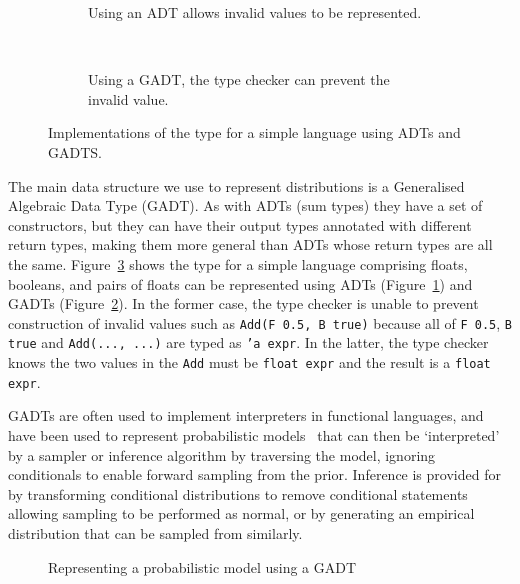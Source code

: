 \documentclass[sigconf]{acmart}
\begin{document}
\begin{figure}
  \centering
  \begin{subfigure}[t]{\columnwidth}
    \caption{\label{lst:adt}Using an ADT allows invalid values to be represented.}
  \end{subfigure}
  \quad\\
  \begin{subfigure}[t]{\columnwidth}
    \caption{\label{lst:gadteg}Using a GADT, the type checker can prevent the invalid value.}
  \end{subfigure}
  \caption{\label{lst:adtgadt}Implementations of the type for a simple language using ADTs and GADTS.}
\end{figure}

The main data structure we use to represent distributions is a Generalised Algebraic Data Type (GADT). As with ADTs (sum types) they have a set of constructors, but they can have their output types annotated with different return types, making them more general than ADTs whose return types are all the same. Figure~\ref{lst:adtgadt} shows the type for  a simple language comprising floats, booleans, and pairs of floats can be represented using ADTs (Figure~\ref{lst:adt}) and GADTs (Figure~\ref{lst:gadteg}). In the former case, the type checker is unable to prevent construction of invalid values such as \texttt{Add(F 0.5, B true)} because all of \texttt{F 0.5}, \texttt{B true} and \texttt{Add(..., ...)} are typed as \texttt{'a expr}. In the latter, the type checker knows the two values in the \texttt{Add} must be \texttt{float expr} and the result is a \texttt{float expr}.

GADTs are often used to implement interpreters in functional languages, and have been used to represent probabilistic models~\cite{scibior2015practical} that can then be `interpreted' by a sampler or inference algorithm by traversing the model, ignoring conditionals to enable forward sampling from the prior. Inference is provided for by transforming conditional distributions to remove conditional statements allowing sampling to be performed as normal, or by generating an empirical distribution that can be sampled from similarly.

\begin{figure}
  \small
  \caption{\label{lst:gadt}Representing a probabilistic model using a GADT}
\end{figure}
\end{document}

